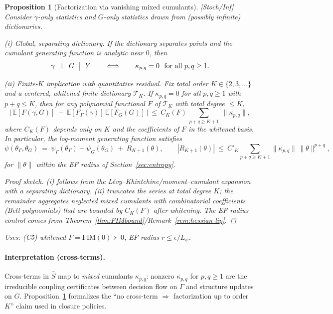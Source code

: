 \documentclass[10pt]{article}
\newcommand{\FIM}{\mathrm{FIM}}
\newcommand{\uses}[1]{\par\smallskip\noindent\textit{Uses: }#1\par\smallskip}
\newenvironment{proofsketch}{\begin{proof}[Proof sketch]}{\end{proof}}
\newtheorem{proposition}{Proposition}
\begin{document}
\begin{proposition}[Factorization via vanishing mixed cumulants]\label{prop:factorization}
\emph{[\textup{Stoch/Inf}]}
Consider $\gamma$-only statistics and $G$-only statistics drawn from (possibly infinite) dictionaries.

\emph{(i) Global, separating dictionary.}
If the dictionary separates points and the cumulant generating function is analytic near $0$, then
\[
\gamma\ \perp\ G\ \bigm|\ Y \qquad \Longleftrightarrow \qquad \kappa_{p,q}=0\ \ \text{for all }p,q\ge 1.
\]

\emph{(ii) Finite-$K$ implication with quantitative residual.}
Fix total order $K\in\{2,3,\dots\}$ and a centered, whitened finite dictionary $\mathcal T_K$. If $\kappa_{p,q}=0$ for all $p,q\ge1$ with $p+q\le K$, then for any polynomial functional $F$ of $\mathcal T_K$ with total degree $\le K$,
\[
\Big|\,\mathbb E[F(\gamma,G)]\ -\ \mathbb E[F_\Gamma(\gamma)]\,\mathbb E[F_G(G)]\,\Big|
\ \le\ C_K(F)\,\sum_{p+q\ge K+1}\ \|\kappa_{p,q}\|,
\]
where $C_K(F)$ depends only on $K$ and the coefficients of $F$ in the whitened basis. In particular, the log-moment generating function satisfies
\[
\psi(\theta_\Gamma,\theta_G)\ =\ \psi_\Gamma(\theta_\Gamma)+\psi_G(\theta_G)\ +\ R_{K+1}(\theta),
\qquad |R_{K+1}(\theta)|\ \le\ C'_K\!\sum_{p+q\ge K+1}\|\kappa_{p,q}\|\,\|\theta\|^{p+q},
\]
for $\|\theta\|$ within the EF radius of Section~\ref{sec:entropy}.
\begin{proofsketch}
(i) follows from the Lévy–Khintchine/moment–cumulant expansion with a separating dictionary. (ii) truncates the series at total degree $K$; the remainder aggregates neglected mixed cumulants with combinatorial coefficients (Bell polynomials) that are bounded by $C_K(F)$ after whitening. The EF radius control comes from Theorem~\ref{thm:FIMbound}/Remark~\ref{rem:hessian-lip}.
\end{proofsketch}
\uses{(C5) whitened $F=\FIM(0)\!\succ0$, EF radius $r\le \epsilon/L_\psi$.}
\end{proposition}

\paragraph{Interpretation (cross-terms).}
Cross-terms in $\hat S$ map to \emph{mixed} cumulants $\kappa_{p,q}$: nonzero $\kappa_{p,q}$ for $p,q\ge1$ are the irreducible coupling certificates between decision flow on $\Gamma$ and structure updates on $G$. Proposition~\ref{prop:factorization} formalizes the “no cross-term $\Rightarrow$ factorization up to order $K$” claim used in closure policies.
\end{document}
